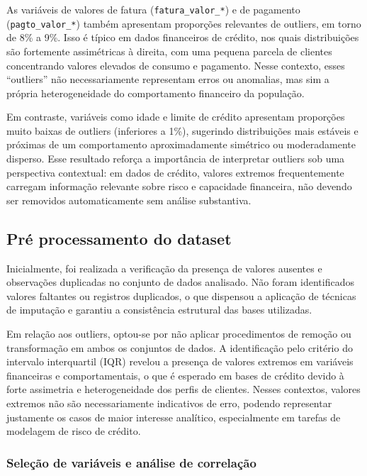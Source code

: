 \documentclass[
  brazilian,
  12pt,
  letterpaper,
  DIV=11,
  numbers=noendperiod]{scrartcl}
\begin{document}
As variáveis de valores de fatura (\texttt{fatura\_valor\_*}) e de
pagamento (\texttt{pagto\_valor\_*}) também apresentam proporções
relevantes de outliers, em torno de 8\% a 9\%. Isso é típico em dados
financeiros de crédito, nos quais distribuições são fortemente
assimétricas à direita, com uma pequena parcela de clientes concentrando
valores elevados de consumo e pagamento. Nesse contexto, esses
``outliers'' não necessariamente representam erros ou anomalias, mas sim
a própria heterogeneidade do comportamento financeiro da população.

Em contraste, variáveis como idade e limite de crédito apresentam
proporções muito baixas de outliers (inferiores a 1\%), sugerindo
distribuições mais estáveis e próximas de um comportamento
aproximadamente simétrico ou moderadamente disperso. Esse resultado
reforça a importância de interpretar outliers sob uma perspectiva
contextual: em dados de crédito, valores extremos frequentemente
carregam informação relevante sobre risco e capacidade financeira, não
devendo ser removidos automaticamente sem análise substantiva.

\subsection{Pré processamento do
dataset}\label{pruxe9-processamento-do-dataset}

Inicialmente, foi realizada a verificação da presença de valores
ausentes e observações duplicadas no conjunto de dados analisado. Não
foram identificados valores faltantes ou registros duplicados, o que
dispensou a aplicação de técnicas de imputação e garantiu a consistência
estrutural das bases utilizadas.

Em relação aos outliers, optou-se por não aplicar procedimentos de
remoção ou transformação em ambos os conjuntos de dados. A identificação
pelo critério do intervalo interquartil (IQR) revelou a presença de
valores extremos em variáveis financeiras e comportamentais, o que é
esperado em bases de crédito devido à forte assimetria e heterogeneidade
dos perfis de clientes. Nesses contextos, valores extremos não são
necessariamente indicativos de erro, podendo representar justamente os
casos de maior interesse analítico, especialmente em tarefas de
modelagem de risco de crédito.

\subsubsection{Seleção de variáveis e análise de
correlação}\label{seleuxe7uxe3o-de-variuxe1veis-e-anuxe1lise-de-correlauxe7uxe3o}
\end{document}
